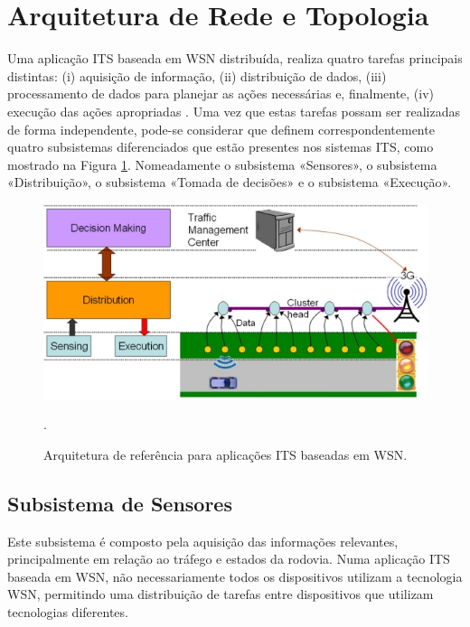 \documentclass[
	12pt,				%
	oneside,			%
	a4paper,			%
	english,			%
	brazil				%
	]{abntex2ppgsi}
\begin{document}

\section{Arquitetura de Rede e Topologia}

Uma aplicação ITS baseada em WSN distribuída, realiza quatro tarefas principais distintas: (i) aquisição de informação, (ii) distribuição de dados, (iii) processamento de dados para planejar as ações necessárias e, finalmente, (iv) execução das ações apropriadas  \cite{losilla2011comprehensive}. Uma vez que estas tarefas possam ser realizadas de forma independente, pode-se considerar que definem correspondentemente quatro subsistemas diferenciados que estão presentes nos sistemas ITS, como mostrado na Figura \ref{fig:arquiteturas_its_wsn}. Nomeadamente o subsistema «Sensores», o subsistema «Distribuição», o subsistema «Tomada de decisões» e o subsistema «Execução». 

\begin{figure}[h!]
	\centering
	\includegraphics[width=0.8\columnwidth]{images/camadas_wsn.jpg}
	\caption{Arquitetura de referência para aplicações ITS baseadas em WSN. \cite{losilla2011comprehensive}}.
	\label{fig:arquiteturas_its_wsn}
\end{figure}

\subsection{Subsistema de Sensores}

Este subsistema é composto pela aquisição das informações relevantes, principalmente em relação ao tráfego e estados da rodovia. Numa aplicação ITS baseada em WSN, não necessariamente todos os dispositivos utilizam a tecnologia WSN, permitindo uma distribuição de tarefas entre dispositivos que utilizam tecnologias diferentes. 
\end{document}
